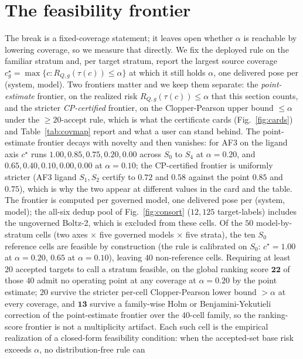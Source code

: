 \documentclass[10pt]{article}
\begin{document}
\section{The feasibility frontier}\label{sec:frontier}
The break is a fixed-coverage statement; it leaves open whether $\alpha$ is reachable by lowering coverage,
so we measure that directly. We fix the deployed rule on the familiar stratum and, per target stratum,
report the largest source coverage $c^\star_g=\max\{c:R_{Q,g}(\tau(c))\le\alpha\}$ at which it still holds
$\alpha$, one delivered pose per (system, model). Two frontiers matter and we keep them separate: the
\emph{point-estimate} frontier, on the realized risk $R_{Q,g}(\tau(c))\le\alpha$ that this section counts,
and the stricter \emph{CP-certified} frontier, on the Clopper-Pearson upper bound $\le\alpha$ under the
$\ge\!20$-accept rule, which is what the certificate cards (Fig.~\ref{fig:cards}) and Table~\ref{tab:covmap}
report and what a user can stand behind. The point-estimate frontier decays with novelty and then vanishes:
for AF3 on the ligand axis $c^\star$ runs $1.00,0.85,0.75,0.20,0.00$ across $S_0$ to $S_4$ at $\alpha=0.20$,
and $0.65,0.40,0.10,0.00,0.00$ at $\alpha=0.10$; the CP-certified frontier is uniformly stricter (AF3
ligand $S_1,S_2$ certify to $0.72$ and $0.58$ against the point $0.85$ and $0.75$), which is why the two
appear at different values in the card and the table. The frontier is computed per governed model, one delivered
pose per (system, model); the all-six dedup pool of Fig.~\ref{fig:consort} ($12{,}125$ target-labels)
includes the ungoverned Boltz-2, which is excluded from these cells. Of the $50$ model-by-stratum cells (two
axes $\times$ five governed models $\times$ five strata), the ten $S_0$ reference cells are feasible by
construction (the rule is calibrated on $S_0$: $c^\star\!=\!1.00$ at $\alpha=0.20$, $0.65$ at $\alpha=0.10$),
leaving $40$ non-reference cells. Requiring at least $20$ accepted targets to call a stratum feasible, on the
global ranking score $\mathbf{22}$ of those $40$ admit no operating point at any coverage at $\alpha=0.20$ by
the point estimate; $20$ survive the stricter per-cell Clopper-Pearson lower bound $>\alpha$ at every
coverage, and $\mathbf{13}$ survive a family-wise Holm or Benjamini-Yekutieli correction of the
point-estimate frontier over the $40$-cell family, so the ranking-score frontier is not a multiplicity
artifact. Each such cell is the empirical realization of a closed-form
feasibility condition: when the accepted-set base risk exceeds $\alpha$, no distribution-free rule can
\end{document}
